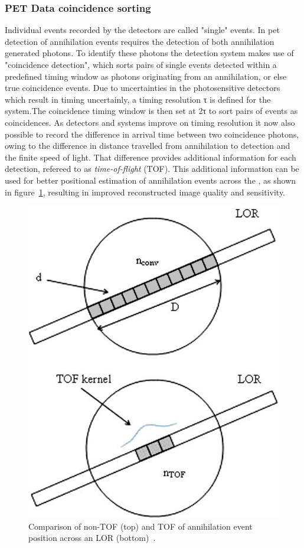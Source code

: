 \subsubsection{PET Data coincidence sorting}
Individual events recorded by the detectors are called "single" events. In \gls{pet} detection of annihilation events requires the detection of both annihilation generated photons. To identify these photons the detection system makes use of "coincidence detection", which sorts pairs of single events detected within a predefined timing window as photons originating from an annihilation, or else true coincidence events. 
Due to uncertainties in the photosensitive detectors which result in timing uncertainly, a timing resolution τ is defined for the system.The coincidence timing window is then set at 2τ to sort pairs of events as coincidences.
As detectors and systems improve on timing resolution it now also possible to record the difference in arrival time between two coincidence photons, owing to the difference in distance travelled from annihilation to detection and the finite speed of light. That difference provides additional information for each detection, refereed to as \textit{time-of-flight} (TOF). This additional information can be used for better positional estimation of annihilation events across the , as shown in figure~\ref{fig_2:TOF_bin}, resulting in improved reconstructed image quality and sensitivity.
%
%
\begin{figure} [h!]
\centering
\includegraphics[scale=0.55,angle=0]{2_Theory_Methods/figures/TOF_bin.png}
\caption{Comparison of non-TOF (top) and TOF of annihilation event position across an LOR (bottom)~\cite{Conti2009}.} 
\label{fig_2:TOF_bin}
\end{figure} 
